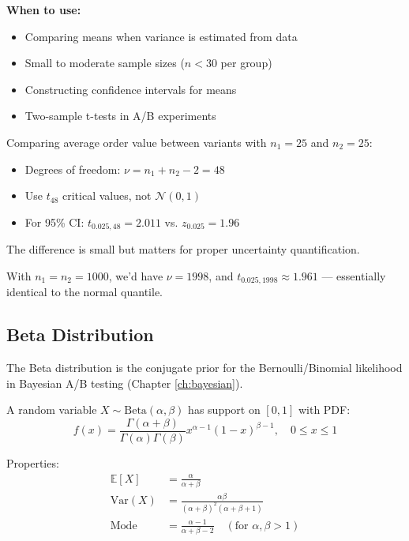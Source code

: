 \textbf{When to use:}
\begin{itemize}
    \item Comparing means when variance is estimated from data
    \item Small to moderate sample sizes ($n < 30$ per group)
    \item Constructing confidence intervals for means
    \item Two-sample t-tests in A/B experiments
\end{itemize}

\begin{example}
Comparing average order value between variants with $n_1 = 25$ and $n_2 = 25$:
\begin{itemize}
    \item Degrees of freedom: $\nu = n_1 + n_2 - 2 = 48$
    \item Use $t_{48}$ critical values, not $\mathcal{N}(0,1)$
    \item For 95\% CI: $t_{0.025, 48} = 2.011$ vs. $z_{0.025} = 1.96$
\end{itemize}

The difference is small but matters for proper uncertainty quantification.

With $n_1 = n_2 = 1000$, we'd have $\nu = 1998$, and $t_{0.025, 1998} \approx 1.961$ — essentially identical to the normal quantile.
\end{example}

\subsection{Beta Distribution}

The Beta distribution is the conjugate prior for the Bernoulli/Binomial likelihood in Bayesian A/B testing (Chapter \ref{ch:bayesian}).

\begin{definition}
A random variable $X \sim \text{Beta}(\alpha, \beta)$ has support on $[0,1]$ with PDF:
\begin{equation}
f(x) = \frac{\Gamma(\alpha + \beta)}{\Gamma(\alpha)\Gamma(\beta)} x^{\alpha-1}(1-x)^{\beta-1}, \quad 0 \leq x \leq 1
\end{equation}

Properties:
\begin{align}
\mathbb{E}[X] &= \frac{\alpha}{\alpha + \beta} \\
\text{Var}(X) &= \frac{\alpha\beta}{(\alpha+\beta)^2(\alpha+\beta+1)} \\
\text{Mode} &= \frac{\alpha-1}{\alpha+\beta-2} \quad (\text{for } \alpha, \beta > 1)
\end{align}
\end{definition}

